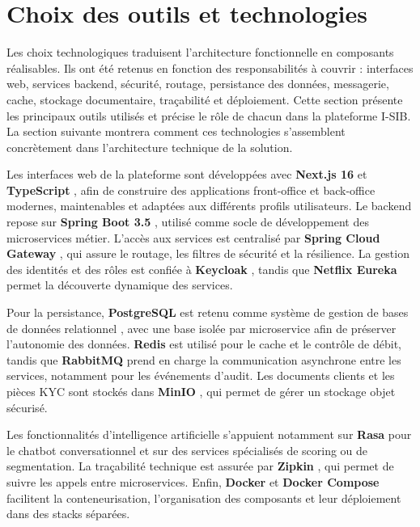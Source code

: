 \documentclass[a4paper,12pt]{report}
\begin{document}
\section{Choix des outils et technologies}

Les choix technologiques traduisent l'architecture fonctionnelle en composants
réalisables. Ils ont été retenus en fonction des responsabilités à couvrir :
interfaces web, services backend, sécurité, routage, persistance des données,
messagerie, cache, stockage documentaire, traçabilité et déploiement. Cette section
présente les principaux outils utilisés et précise le rôle de chacun dans la plateforme
I-SIB. La section suivante montrera comment ces technologies s'assemblent concrètement
dans l'architecture technique de la solution.

Les interfaces web de la plateforme sont développées avec \textbf{Next.js 16}
\cite{nextjs_docs} et \textbf{TypeScript} \cite{typescript_docs}, afin de construire des applications front-office et back-office
modernes, maintenables et adaptées aux différents profils utilisateurs. Le backend repose
sur \textbf{Spring Boot 3.5} \cite{spring_boot_docs}, utilisé comme socle de développement des microservices
métier. L'accès aux services est centralisé par \textbf{Spring Cloud Gateway}
\cite{spring_gateway_docs}, qui assure
le routage, les filtres de sécurité et la résilience. La gestion des identités et des
rôles est confiée à \textbf{Keycloak} \cite{keycloak_docs}, tandis que
\textbf{Netflix Eureka} \cite{spring_eureka_docs} permet la découverte dynamique des services.

Pour la persistance, \textbf{PostgreSQL} est retenu comme système de gestion de bases de
données relationnel \cite{postgresql_docs}, avec une base isolée par microservice afin de préserver l'autonomie
des données. \textbf{Redis} \cite{redis_docs} est utilisé pour le cache et le contrôle de débit, tandis que
\textbf{RabbitMQ} \cite{rabbitmq_docs} prend en charge la communication asynchrone entre les services,
notamment pour les événements d'audit. Les documents clients et les pièces KYC sont
stockés dans \textbf{MinIO} \cite{minio_docs}, qui permet de gérer un stockage objet sécurisé.

Les fonctionnalités d'intelligence artificielle s'appuient notamment sur \textbf{Rasa}
\cite{rasa_docs}
pour le chatbot conversationnel et sur des services spécialisés de scoring ou de
segmentation. La traçabilité technique est assurée par \textbf{Zipkin} \cite{zipkin_docs}, qui permet de
suivre les appels entre microservices. Enfin, \textbf{Docker} \cite{docker_docs} et
\textbf{Docker Compose} \cite{docker_compose_docs}
facilitent la conteneurisation, l'organisation des composants et leur déploiement dans des
stacks séparées.
\end{document}
